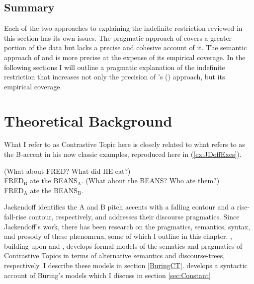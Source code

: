 \documentclass[
	letterpaper,
]{article}
\begin{document}
\subsection{Summary}
Each of the two approaches to explaining the indefinite restriction reviewed in this section has its own issues.
The pragmatic approach of \textcite{mikkelsen2005copular} covers a greater portion of the data but lacks a precise and cohesive account of it.
The semantic approach of \textcite{heycockkroch1999pseudocleft} and \textcite{heycock2012specification} is more precise at the expense of its empirical coverage.
In the following sections I will outline a pragmatic explanation of the indefinite restriction that increases not only the precision of \citeauthor{mikkelsen2005copular}'s (\citeyear{mikkelsen2005copular}) approach, but its empirical coverage.
\section{Theoretical Background}\label{sec:TheoryBackground}
What I refer to as Contrastive Topic here is closely related to what \textcite{jackendoff1972semantics} refers to as the B-accent in his now classic examples, reproduced here in (\ref{ex:JDoffExes}).
\begin{exe}
	\ex\label{ex:JDoffExes}
	\begin{xlist}
		\ex (What about FRED? What did HE eat?)\\
		FRED$_{\text{B}}$ ate the BEANS$_{\text{A}}$.
		\ex (What about the BEANS? Who ate them?)\\
		FRED$_{\text{A}}$ ate the BEANS$_{\text{B}}$.\hfill\parencite[261]{jackendoff1972semantics}
	\end{xlist}
\end{exe}
Jackendoff identifies the A and B pitch accents with a falling contour and a rise-fall-rise contour, respectively, and addresses their discourse pragmatics.
Since Jackendoff's work, there has been research on the pragmatics, semantics, syntax, and prosody of these phenomena, some of which I outline in this chapter.
\textcite{buring2003d}, building upon \textcite{rooth1992theory} and \textcite{roberts2012information}, develops formal models of the sematics and pragmatics of Contrastive Topics in terms of alternative semantics and discourse-trees, respectively. 
I describe these models in section \ref{BuringCT}.
\textcite{constant2014diss} develops a syntactic account of B\"uring's models which I discuss in section \ref{sec:Constant}
\end{document}
